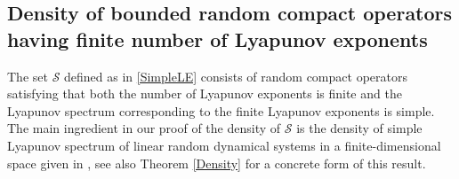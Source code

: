\documentclass[pdflatex,sn-mathphys-num]{sn-jnl}%
\theoremstyle{thmstyleone}%
\theoremstyle{thmstyletwo}%
\theoremstyle{thmstylethree}%
\newcommand{\cS}{\mathcal{S}}
\numberwithin{equation}{section}
\begin{document}
\subsection{Density of bounded random compact operators having finite  number of Lyapunov exponents}
%

%

The set $\cS$ defined as in \eqref{SimpleLE} consists of random compact operators satisfying that both the number of Lyapunov exponents is finite and the Lyapunov spectrum corresponding to the finite Lyapunov exponents is simple. The main ingredient in our proof of the density of   $\cS$ is the density of simple Lyapunov spectrum of linear random dynamical systems in a finite-dimensional space given in \cite{Knill92,Arnold_Cong_1999}, see also Theorem \ref{Density} for a concrete form of this result.  
%
%
%
%
\end{document}
